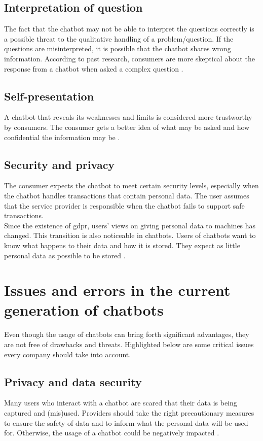 \subsection{Interpretation of question}
The fact that the chatbot may not be able to interpret the questions correctly is a possible threat to the qualitative handling of a problem/question. If the questions are misinterpreted, it is possible that the chatbot shares wrong information. According to past research, consumers are more skeptical about the response from a chatbot when asked a complex question \citep*{Folstad2018,Nordheim2019}.

\subsection{Self-presentation}
A chatbot that reveals its weaknesses and limits is considered more trustworthy by consumers. The consumer gets a better idea of what may be asked and how confidential the information may be \citep{Folstad2018}.

\subsection{Security and privacy}
The consumer expects the chatbot to meet certain security levels, especially when the chatbot handles transactions that contain personal data. The user assumes that the service provider is responsible when the chatbot fails to support safe transactions.\\
Since the existence of \acrfull{gdpr}, users' views on giving personal data to machines has changed. This transition is also noticeable in chatbots. Users of chatbots want to know what happens to their data and how it is stored. They expect as little personal data as possible to be stored \citep*{Folstad2018, Nordheim2019}. 

\section{Issues and errors in the current generation of chatbots}
Even though the usage of chatbots can bring forth significant advantages, they are not free of drawbacks and threats. Highlighted below are some critical issues every company should take into account.

\subsection{Privacy and data security}
Many users who interact with a chatbot are scared that their data is being captured and (mis)used. Providers should take the right precautionary measures to ensure the safety of data and to inform what the personal data will be used for. Otherwise, the usage of a chatbot could be negatively impacted \citep*{Adamopoulou2020, Duka2021, Rese2020}.

